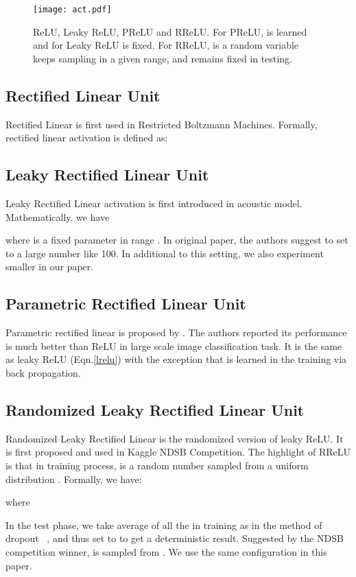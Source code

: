 \documentclass{article}
\begin{document}
\begin{figure}[!htb]
  \centering
    \texttt{[image: act.pdf]}
      \caption{ReLU, Leaky ReLU, PReLU and  RReLU. For PReLU,  is learned and for Leaky ReLU  is fixed. For RReLU,  is a random variable keeps sampling in a given range, and remains fixed in testing.}
    \label{fig:act}
\end{figure}

\subsection{Rectified Linear Unit}
Rectified Linear is first used in Restricted Boltzmann Machines\citep{nair2010rectified}. Formally, rectified linear activation is defined as:






\subsection{Leaky Rectified Linear Unit}
Leaky Rectified Linear activation is first introduced in acoustic model\citep{maas2013rectifier}. Mathematically, we have

where  is a fixed parameter in range . In original paper, the authors suggest to set  to a large number like 100. In additional to this setting, we also experiment smaller  in our paper.
 
\subsection{Parametric Rectified Linear Unit}
Parametric rectified linear is proposed by \citep{he2015delving}. The authors reported its performance is much better than ReLU in large scale image classification task. It is the same as leaky ReLU (Eqn.\ref{lrelu}) with the exception that  is learned in the training via back propagation.

\subsection{Randomized Leaky Rectified Linear Unit}
Randomized Leaky Rectified Linear is the randomized version of leaky ReLU. It is first proposed and used in Kaggle NDSB Competition. The highlight of RReLU is that in training process,  is a random number sampled from a uniform distribution . Formally, we have:

where

In the test phase, we take average of all the  in training as in the method of dropout~\citep{srivastava2014dropout} , and thus set  to  to get a deterministic result. Suggested by the NDSB competition winner,  is sampled from . We use the same configuration in this paper.
\end{document}
